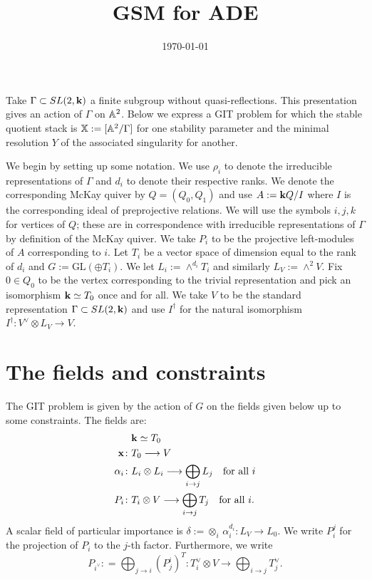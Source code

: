 \documentclass{amsart}
\title{GSM for ADE}
\date{\today}
\theoremstyle{definition}
\begin{document}
\maketitle

Take $\Gamma \subset SL(2,\mathbf{k})$ a finite subgroup without quasi-reflections.
This presentation gives an action of $\Gamma$ on $\mathbb{A}^2$.
Below we express a GIT problem for which the stable quotient stack is $\mathbb{X}:= [\mathbb{A}^2/ \Gamma]$ for one stability parameter and the minimal resolution $Y$ of the associated singularity for another.

We begin by setting up some notation.
We use $\rho_i$ to denote the irreducible representations of $\Gamma$ and $d_i$ to denote their respective ranks.
We denote the corresponding McKay quiver by $Q = (Q_0, Q_1)$ and use $A:= \mathbf{k} Q/I$ where $I$ is the corresponding ideal of preprojective relations.
We will use the symbols $i,j,k$ for vertices of $Q$; these are in correspondence with irreducible representations of $\Gamma$ by definition of the McKay quiver.
We take $P_i$ to be the projective left-modules of $A$ corresponding to $i$.
Let $T_i$ be a vector space of dimension equal to the rank of $d_i$ and $G:= \text{GL}(\oplus T_i)$.
We let $L_i:= \wedge^{d_i} T_i$ and similarly $L_V:= \wedge^2 V$.
Fix $0 \in Q_0$ to be the vertex corresponding to the trivial representation and pick an isomorphism $\mathbf{k} \simeq T_0$ once and for all.
We take $V$ to be the standard representation $\Gamma \subset SL(2,\mathbf{k})$ and use $I^\dagger$ for the natural isomorphism $I^\dagger \colon V^\vee \otimes L_V \rightarrow V$.

\section{The fields and constraints}
The GIT problem is given by the action of $G$ on the fields given below up to some constraints.
The fields are:
\begin{align}
    &\mathbf{k} \simeq T_0 \\
\mathbf{x} \colon &T_0 \longrightarrow V \label{fd:x} \\
\alpha_i \colon &L_i \otimes L_i \longrightarrow \bigoplus_{i \rightarrow j} L_j \quad \text{for all} \,\, i \label{fd:alpha} \\
 P_i \colon &T_i \otimes V \longrightarrow \bigoplus_{i \rightarrow j} T_j \quad \text{for all} \,\, i. \label{fd:P}
\end{align}
A scalar field of particular importance is $\delta:= \otimes_i \,\alpha_i^{d_i}: L_V \rightarrow L_0$. 
We write $P_i^j$ for the projection of $P_i$ to the $j$-th factor. 
Furthermore, we write $$ P_{i^\vee}: = \bigoplus_{j \rightarrow i} (P_j^i)^T \colon T_i^\vee \otimes V \longrightarrow \bigoplus_{i \rightarrow j} T_j^\vee.$$
\end{document}
